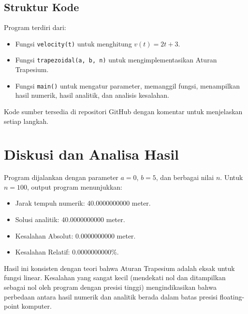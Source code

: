 \documentclass[conference]{IEEEtran}
\begin{document}
\subsection{Struktur Kode}
Program terdiri dari:
\begin{itemize}
    \item Fungsi \texttt{velocity(t)} untuk menghitung \( v(t) = 2t + 3 \).
    \item Fungsi \texttt{trapezoidal(a, b, n)} untuk mengimplementasikan Aturan Trapesium.
    \item Fungsi \texttt{main()} untuk mengatur parameter, memanggil fungsi, menampilkan hasil numerik, hasil analitik, dan analisis kesalahan.
\end{itemize}
Kode sumber tersedia di repositori GitHub \cite{b2} dengan komentar untuk menjelaskan setiap langkah.

\section{Diskusi dan Analisa Hasil}
Program dijalankan dengan parameter \( a = 0 \), \( b = 5 \), dan berbagai nilai \( n \). Untuk \( n = 100 \), output program menunjukkan:
\begin{itemize}
    \item Jarak tempuh numerik: 40.0000000000 meter.
    \item Solusi analitik: 40.0000000000 meter.
    \item Kesalahan Absolut: 0.0000000000 meter.
    \item Kesalahan Relatif: 0.0000000000\%.
\end{itemize}
Hasil ini konsisten dengan teori bahwa Aturan Trapesium adalah eksak untuk fungsi linear. Kesalahan yang sangat kecil (mendekati nol dan ditampilkan sebagai nol oleh program dengan presisi tinggi) mengindikasikan bahwa perbedaan antara hasil numerik dan analitik berada dalam batas presisi floating-point komputer.
\end{document}
